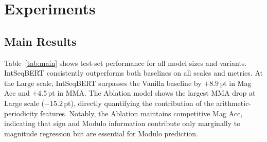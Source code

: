 
\section{Experiments}
\label{sec:experiments}

\subsection{Main Results}
\label{sec:main-results}

Table~\ref{tab:main} shows test-set performance for all model sizes and variants. IntSeqBERT
consistently outperforms both baselines on all scales and metrics. At the Large scale,
IntSeqBERT surpasses the Vanilla baseline by $+8.9$\,pt in Mag Acc and $+4.5$\,pt in MMA.
The Ablation model shows the largest MMA drop at Large scale ($-15.2$\,pt), directly
quantifying the contribution of the arithmetic-periodicity features. Notably, the Ablation
maintains competitive Mag Acc, indicating that sign and Modulo information contribute only
marginally to magnitude regression but are essential for Modulo prediction.


